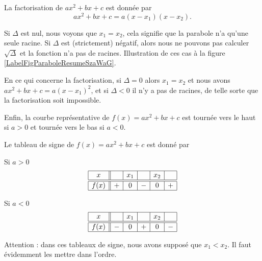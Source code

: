 La factorisation de \( ax^2+bx+c\) est donnée par
\begin{equation}
    ax^2+bx+c=a(x-x_1)(x-x_2).
\end{equation}

Si \( \Delta\) est nul, nous voyons que \( x_1=x_2\), cela signifie que la parabole n'a qu'une seule racine. Si \( \Delta\) est (strictement) négatif, alors nous ne pouvons pas calculer \( \sqrt{\Delta}\) et la fonction n'a pas de racines. Illustration de ces cas à la figure \ref{LabelFigParaboleResumeSzaWaG}. %
\newcommand{\CaptionFigParaboleResumeSzaWaG}{Les cas où \( \Delta\) n'est pas strictement positifs correspondent à des paraboles ayant une seule ou pas du tout de racines.}


En ce qui concerne la factorisation, si \( \Delta=0\) alors \( x_1=x_2\) et nous avons \( ax^2+bx+c=a(x-x_1)^2\), et si \( \Delta<0\) il n'y a pas de racines, de telle sorte que la factorisation soit impossible.

Enfin, la courbe représentative de \( f(x)=ax^2+bx+c\) est tournée vers le haut si \( a>0\) et tournée vers le bas si \( a<0\).

Le tableau de signe de \( f(x)=ax^2+bx+c\) est donné par
\begin{multicols}{2}
    \begin{center}
        Si \( a>0\)
        \begin{equation*}
            \begin{array}[]{|c||c|c|c|c|c|}
                \hline
                 x&&x_1&&x_2&\\
                  \hline\hline
                  f(x)&+&0&-&0&+\\ 
                  \hline 
                   \end{array}
               \end{equation*}
    \end{center}
    \columnbreak
    \begin{center}
        Si \( a<0\)
        \begin{equation*}
            \begin{array}[]{|c||c|c|c|c|c|}
                \hline
                 x&&x_1&&x_2&\\
                  \hline\hline
                  f(x)&-&0&+&0&-\\ 
                  \hline 
                   \end{array}
               \end{equation*}
    \end{center}

\end{multicols}
    Attention : dans ces tableaux de signe, nous avons supposé que \( x_1<x_2\). Il faut évidemment les mettre dans l'ordre.

